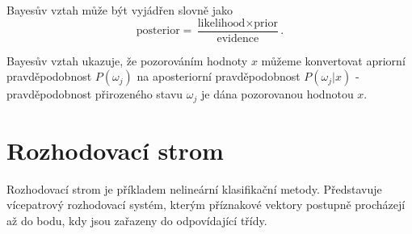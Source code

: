 \par{Bayesův vztah může být vyjádřen slovně jako
\begin{equation}
	\mbox{posterior} = \frac{\mbox{likelihood} \times \mbox{prior}}{\mbox{evidence}}.
\end{equation}}

\par{Bayesův vztah ukazuje, že pozorováním hodnoty $x$ můžeme konvertovat apriorní pravděpodobnost $P(\omega_j)$ na aposteriorní pravděpodobnost $P(\omega_j|x)$ - pravděpodobnost přirozeného stavu $\omega_j$ je dána pozorovanou hodnotou $x$.}





\newpage















\section{Rozhodovací strom}
\label{sec:DecisionTree}
\par{Rozhodovací strom je příkladem nelineární klasifikační metody. Představuje vícepatrový rozhodovací systém, kterým příznakové vektory postupně procházejí až do bodu, kdy jsou zařazeny do odpovídající třídy.}

